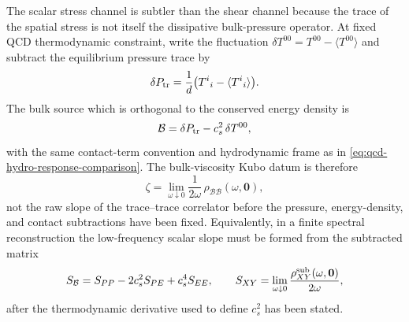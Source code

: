 \begin{controlledapproximation}
\label{ca:qcd-finite-bulk-sound-spectral-window}
The scalar stress channel is subtler than the shear channel because the trace
of the spatial stress is not itself the dissipative bulk-pressure operator.
At fixed QCD thermodynamic constraint, write the fluctuation
\(\delta T^{00}=T^{00}-\langle T^{00}\rangle\) and subtract the equilibrium
pressure trace by
\[
  \delta P_{\rm tr}
  =
  \frac1d\bigl(T^i{}_i-\langle T^i{}_i\rangle\bigr).
\]
The bulk source which is orthogonal to the conserved energy density is
\begin{equation}
  \mathcal B
  =
  \delta P_{\rm tr}-c_s^2\,\delta T^{00},
  \label{eq:qcd-bulk-subtracted-source}
\end{equation}
with the same contact-term convention and hydrodynamic frame as in
\eqref{eq:qcd-hydro-response-comparison}.  The bulk-viscosity Kubo datum is
therefore
\begin{equation}
  \zeta
  =
  \lim_{\omega\downarrow0}
  \frac{1}{2\omega}\,
  \rho_{\mathcal B\mathcal B}(\omega,\mathbf0),
  \label{eq:qcd-bulk-subtracted-kubo}
\end{equation}
not the raw slope of the trace--trace correlator before the pressure,
energy-density, and contact subtractions have been fixed.  Equivalently, in a
finite spectral reconstruction the low-frequency scalar slope must be formed
from the subtracted matrix
\begin{equation}
  S_{\mathcal B}
  =
  S_{PP}
  -2c_s^2S_{PE}
  +c_s^4S_{EE},
  \qquad
  S_{XY}
  =
  \lim_{\omega\downarrow0}
  \frac{\rho_{XY}^{\rm sub}(\omega,\mathbf0)}{2\omega},
  \label{eq:qcd-bulk-slope-subtraction}
\end{equation}
after the thermodynamic derivative used to define \(c_s^2\) has been stated.


\end{controlledapproximation}

